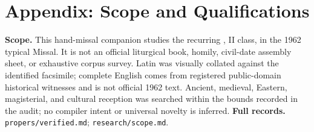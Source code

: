 \section*{Appendix: Scope and Qualifications}

\begin{studyframe}
\textbf{Scope.} This hand-missal companion studies the recurring , II class, in the 1962 typical Missal. It is not an official liturgical book, homily, civil-date assembly sheet, or exhaustive corpus survey. Latin was visually collated against the identified facsimile; complete English comes from registered public-domain historical witnesses and is not official 1962 text. Ancient, medieval, Eastern, magisterial, and cultural reception was searched within the bounds recorded in the audit; no compiler intent or universal novelty is inferred. \textbf{Full records.} \nolinkurl{propers/verified.md}; \nolinkurl{research/scope.md}.
\end{studyframe}
